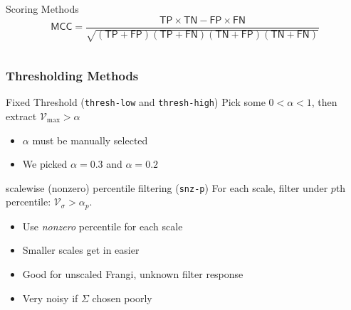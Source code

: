 \documentclass[9pt]{beamer}
\newcommand{\Vmax}{\ensuremath{\mathcal{V}_{\max}}\xspace}
\newcommand{\Vsigma}{\ensuremath{\mathcal{V}_{\sigma}}\xspace}
\newcommand{\TN}{\mathsf{TN}}
\newcommand{\TP}{\mathsf{TP}}
\newcommand{\FN}{\mathsf{FN}}
\newcommand{\FP}{\mathsf{FP}}
\begin{document}
\begin{frame}
\begin{columns}
\begin{column}{0.6\textwidth}
\begin{block}{Scoring Methods}
\begin{equation*}
\textsf{MCC} = \frac{\TP\times \TN - \FP \times \FN}{\sqrt{ (\TP+\FP)(\TP+\FN)(\TN+\FP)(\TN+\FN)}}
\end{equation*}
\end{block}
  \end{column}
\end{columns}
\end{frame}

\begin{frame}
\frametitle{Thresholding Methods}
\begin{block}{Fixed Threshold (\texttt{thresh-low} and \texttt{thresh-high})}
  Pick some $0 < \alpha < 1$, then extract $\Vmax > \alpha$
  \begin{itemize}
    \item $\alpha$ must be manually selected
    \item We picked $\alpha=0.3$ and $\alpha=0.2$
  \end{itemize}
  \end{block}

\begin{block}{scalewise (nonzero) percentile filtering (\texttt{snz-p})}
    For each scale, filter under $p$th percentile: $\Vsigma > \alpha_p$.
    \begin{itemize}
      \item Use \textit{nonzero} percentile for each scale
      \item Smaller scales get in easier
      \item Good for unscaled Frangi, unknown filter response
      \item Very noisy if $\Sigma$ chosen poorly
    \end{itemize}
  \end{block}
\end{frame}
\end{document}
